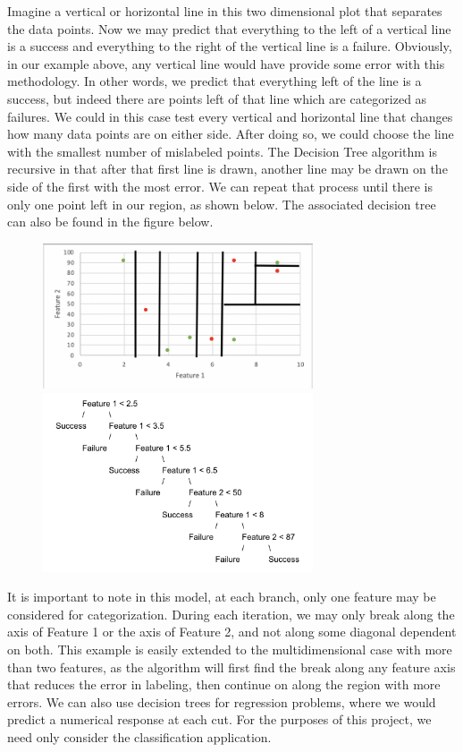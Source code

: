 Imagine a vertical or horizontal line in this two dimensional plot that separates the data points. Now we may predict that everything to the left of a vertical line is a success and everything to the right of the vertical line is a failure. Obviously, in our example above, any vertical line would have provide some error with this methodology. In other words, we predict that everything left of the line is a success, but indeed there are points left of that line which are categorized as failures. We could in this case test every vertical and horizontal line that changes how many data points are on either side. After doing so, we could choose the line with the smallest number of mislabeled points. The Decision Tree algorithm is recursive in that after that first line is drawn, another line may be drawn on the side of the first with the most error. We can repeat that process until there is only one point left in our region, as shown below. The associated decision tree can also be found in the figure below. 

\begin{center}
\begin{figure}[H]
\includegraphics[width=8cm]{body/background/cuttree.png}
\includegraphics[width=8cm]{body/background/decisiontree.png}
\end{figure}
\end{center}

It is important to note in this model, at each branch, only one feature may be considered for categorization. During each iteration, we may only break along the axis of Feature 1 or the axis of Feature 2, and not along some diagonal dependent on both. This example is easily extended to the multidimensional case with more than two features, as the algorithm will first find the break along any feature axis that reduces the error in labeling, then continue on along the region with more errors. We can also use decision trees for regression problems, where we would predict a numerical response at each cut. For the purposes of this project, we need only consider the classification application. \newline

